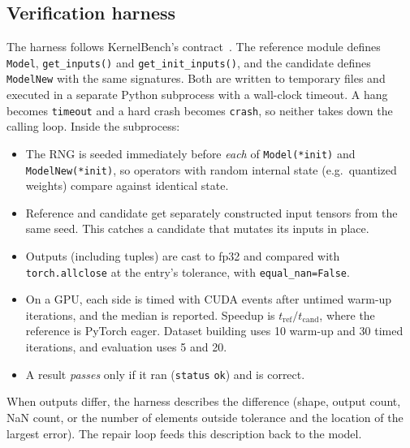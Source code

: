 \documentclass[11pt]{article}
\newcommand{\code}[1]{\texttt{#1}}
\begin{document}
\subsection{Verification harness}
\label{sec:harness}
The harness follows KernelBench's contract~\cite{ouyang2025kernelbench}. The reference module defines
\code{Model}, \code{get\_inputs()} and \code{get\_init\_inputs()}, and the candidate defines
\code{ModelNew} with the same signatures. %
Both are written to temporary files and executed in a separate Python subprocess with a
wall-clock timeout. A hang becomes \code{timeout} and a hard crash becomes \code{crash}, so neither
takes down the calling loop. %
Inside the subprocess:
\begin{itemize}
  \item The RNG is seeded immediately before \emph{each} of \code{Model(*init)} and
        \code{ModelNew(*init)}, so operators with random internal state (e.g.\ quantized weights)
        compare against identical state.
  \item Reference and candidate get separately constructed input tensors from the same seed. This
        catches a candidate that mutates its inputs in place.
  \item Outputs (including tuples) are cast to fp32 and compared with
        \code{torch.allclose} at the entry's tolerance, with \code{equal\_nan=False}.
  \item On a GPU, each side is timed with CUDA events after untimed warm-up iterations, and the
        median is reported. Speedup is $t_{\mathrm{ref}}/t_{\mathrm{cand}}$, where the
        reference is PyTorch eager. Dataset building uses 10 warm-up and 30 timed iterations, and
        evaluation uses 5 and 20. %
  \item A result \emph{passes} only if it ran (\code{status} \code{ok}) and is correct.
\end{itemize}
When outputs differ, the harness describes the difference (shape, output count, NaN count, or the
number of elements outside tolerance and the location of the largest error). The repair loop
feeds this description back to the model.
\end{document}
